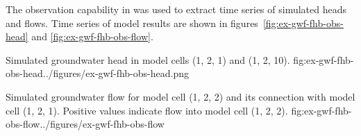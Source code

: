 The observation capability in \mf was used to extract time series of simulated heads and flows.  Time series of model results are shown in figures~\ref{fig:ex-gwf-fhb-obs-head} and \ref{fig:ex-gwf-fhb-obs-flow}.  

\begin{StandardFigure}{
                                     Simulated groundwater head in model cells (1, 2, 1) and (1, 2, 10).
                                     }{fig:ex-gwf-fhb-obs-head}{../figures/ex-gwf-fhb-obs-head.png}
\end{StandardFigure}                                 

\begin{StandardFigure}{
                                     Simulated groundwater flow for model cell (1, 2, 2) and its connection with model cell (1, 2, 1).  Positive values indicate flow into model cell (1, 2, 2).
                                     }{fig:ex-gwf-fhb-obs-flow}{../figures/ex-gwf-fhb-obs-flow}
\end{StandardFigure}                                 

